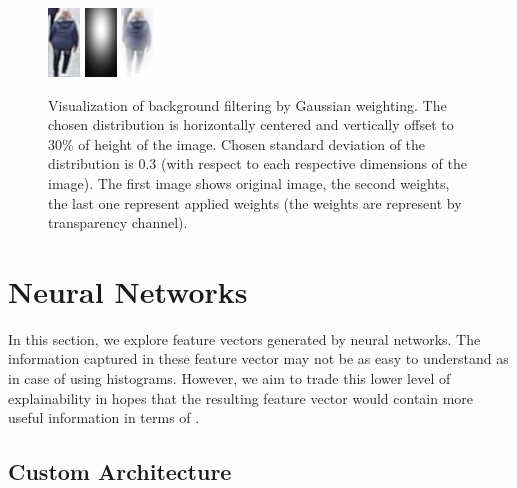 \begin{figure}
    \centering
    \includegraphics{img/background_filter/1_original.png} \hspace{1cm} \includegraphics{img/background_filter/weights.png} \hspace{1cm}
    \includegraphics{img/background_filter/weights_applied.png}
    \caption[Visualization of background filtering by Gaussian weighting]{Visualization of background filtering by Gaussian weighting. The chosen distribution is horizontally centered and vertically offset to 30\% of height of the image. Chosen standard deviation of the distribution is 0.3 (with respect to each respective dimensions of the image). The first image shows original image, the second weights, the last one represent applied weights (the weights are represent by transparency channel).}
    \label{fig:gaussian_weighting}
\end{figure}


\section{Neural Networks}



In this section, we explore feature vectors generated by neural networks. The information captured in these feature vector may not be as easy to understand as in case of using histograms. However, we aim to trade this lower level of explainability in hopes that the resulting feature vector would contain more useful information in terms of \reid{}.


\subsection{Custom Architecture}
\label{ssec:custom_architecture}


